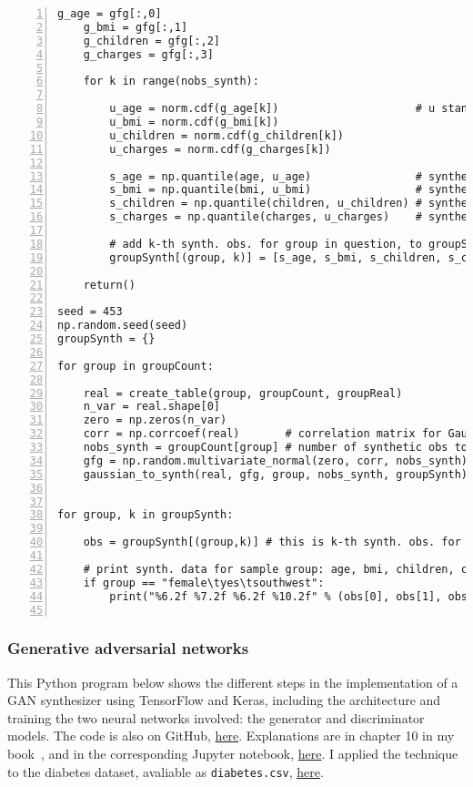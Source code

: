 \documentclass[oneside,10pt]{book}
\begin{document}
\begin{lstlisting}[numbers=left]
    g_age = gfg[:,0]
    g_bmi = gfg[:,1]
    g_children = gfg[:,2]
    g_charges = gfg[:,3]

    for k in range(nobs_synth):   

        u_age = norm.cdf(g_age[k])                     # u stands for uniform[0, 1]
        u_bmi = norm.cdf(g_bmi[k])
        u_children = norm.cdf(g_children[k])
        u_charges = norm.cdf(g_charges[k])

        s_age = np.quantile(age, u_age)                # synthesized age 
        s_bmi = np.quantile(bmi, u_bmi)                # synthesized bmi
        s_children = np.quantile(children, u_children) # synthesized children
        s_charges = np.quantile(charges, u_charges)    # synthesized charges

        # add k-th synth. obs. for group in question, to groupSynth
        groupSynth[(group, k)] = [s_age, s_bmi, s_children, s_charges] 

    return()

seed = 453
np.random.seed(seed)
groupSynth = {}

for group in groupCount:

    real = create_table(group, groupCount, groupReal) 
    n_var = real.shape[0] 
    zero = np.zeros(n_var) 
    corr = np.corrcoef(real)       # correlation matrix for Gaussian copula for this group
    nobs_synth = groupCount[group] # number of synthetic obs to create for this group
    gfg = np.random.multivariate_normal(zero, corr, nobs_synth) 
    gaussian_to_synth(real, gfg, group, nobs_synth, groupSynth)


for group, k in groupSynth:

    obs = groupSynth[(group,k)] # this is k-th synth. obs. for group in question

    # print synth. data for sample group: age, bmi, children, charges
    if group == "female\tyes\tsouthwest":
        print("%6.2f %7.2f %6.2f %10.2f" % (obs[0], obs[1], obs[2], obs[3]))


\end{lstlisting}

\subsubsection{Generative adversarial networks}

This Python program below shows the different steps in the implementation of a GAN synthesizer using TensorFlow and Keras, including
 the architecture and training the two neural networks involved: the generator and discriminator models. The code
 is also on GitHub, \href{https://github.com/VincentGranville/Main/blob/main/GAN_diabetes.py}{here}. Explanations are in chapter 10 in my 
book~\cite{vgelsevier}, and in the corresponding Jupyter notebook, \href{https://github.com/VincentGranville/Notebooks/blob/main/GAN_diabetes.ipynb}{here}. I applied the technique to the diabetes dataset, avaliable as \texttt{diabetes.csv}, 
\href{https://github.com/VincentGranville/Main/blob/main/diabetes.csv}{here}. 
\end{document}
